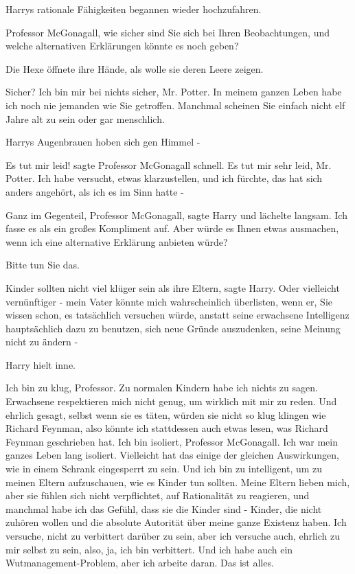 Harrys rationale Fähigkeiten begannen wieder hochzufahren.

\glqq{}Professor McGonagall, wie sicher sind Sie sich bei Ihren Beobachtungen,
und welche alternativen Erklärungen könnte es noch geben?\grqq{}

Die Hexe öffnete ihre Hände, als wolle sie deren Leere zeigen.

\glqq{}Sicher? Ich bin mir bei nichts sicher, Mr. Potter. In meinem ganzen Leben
habe ich noch nie jemanden wie Sie getroffen. Manchmal scheinen Sie einfach
nicht elf Jahre alt zu sein oder gar menschlich.\grqq{}

Harrys Augenbrauen hoben sich gen Himmel -

\glqq{}Es tut mir leid!\grqq{} sagte Professor McGonagall schnell. \glqq{}Es tut
mir sehr leid, Mr. Potter. Ich habe versucht, etwas klarzustellen, und ich
fürchte, das hat sich anders angehört, als ich es im Sinn hatte -\grqq{}

\glqq{}Ganz im Gegenteil, Professor McGonagall\grqq{}, sagte Harry und lächelte
langsam. \glqq{}Ich fasse es als ein großes Kompliment auf. Aber würde es Ihnen
etwas ausmachen, wenn ich eine alternative Erklärung anbieten würde?\grqq{}

\glqq{}Bitte tun Sie das.\grqq{}

\glqq{}Kinder sollten nicht viel klüger sein als ihre Eltern\grqq{}, sagte
Harry. \glqq{}Oder vielleicht vernünftiger - mein Vater könnte mich
wahrscheinlich überlisten, wenn er, Sie wissen schon, es tatsächlich versuchen
würde, anstatt seine erwachsene Intelligenz hauptsächlich dazu zu benutzen, sich
neue Gründe auszudenken, seine Meinung nicht zu ändern -\grqq{}

Harry hielt inne.

\glqq{}Ich bin zu klug, Professor. Zu normalen Kindern habe ich nichts zu sagen.
Erwachsene respektieren mich nicht genug, um wirklich mit mir zu reden. Und
ehrlich gesagt, selbst wenn sie es täten, würden sie nicht so klug klingen wie
Richard Feynman, also könnte ich stattdessen auch etwas lesen, was Richard
Feynman geschrieben hat. Ich bin isoliert, Professor McGonagall. Ich war mein
ganzes Leben lang isoliert. Vielleicht hat das einige der gleichen Auswirkungen,
wie in einem Schrank eingesperrt zu sein. Und ich bin zu intelligent, um zu
meinen Eltern aufzuschauen, wie es Kinder tun sollten. Meine Eltern lieben mich,
aber sie fühlen sich nicht verpflichtet, auf Rationalität zu reagieren, und
manchmal habe ich das Gefühl, dass sie die Kinder sind - Kinder, die nicht
zuhören wollen und die absolute Autorität über meine ganze Existenz haben. Ich
versuche, nicht zu verbittert darüber zu sein, aber ich versuche auch, ehrlich
zu mir selbst zu sein, also, ja, ich bin verbittert. Und ich habe auch ein
Wutmanagement-Problem, aber ich arbeite daran. Das ist alles.\grqq{}

